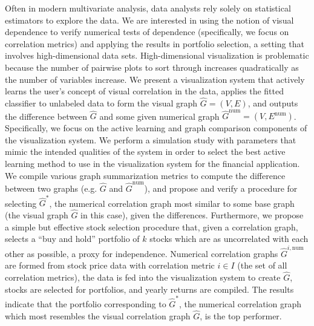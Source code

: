 Often in modern multivariate analysis, data analysts rely solely on statistical
estimators to explore the data. We are interested in using the notion of visual 
dependence to verify numerical tests of dependence (specifically, we 
focus on correlation metrics) and applying the results in portfolio selection, 
a setting that involves high-dimensional data sets. High-dimensional 
visualization is problematic because the number of pairwise plots to sort 
through increases quadratically as the number of variables increase.
We present a visualization system that actively learns the user's concept of
visual correlation in the data, applies the fitted classifier to unlabeled data 
to form the visual graph $\hat{G}=(V,E)$, and outputs the difference between 
$\hat{G}$ and some given numerical graph 
$\hat{G}^{\text{num}}=(V,E^{\text{num}})$.
Specifically, we focus on the active learning and graph comparison components 
of the visualization system. We perform a simulation study with parameters that 
mimic the intended qualities of the system in order to select the best active 
learning method to use in the visualization system for the financial 
application. We compile various graph summarization metrics to compute the 
difference between two graphs (e.g. $\hat{G}$ and $\hat{G}^{\text{num}}$), and 
propose and verify a procedure for selecting $\hat{G}^*$, the numerical 
correlation graph most 
similar to some base graph (the visual graph $\hat{G}$ in this case), given the 
differences. Furthermore, we propose a simple but effective stock selection 
procedure that, given a correlation graph,  selects a ``buy and hold'' 
portfolio of $k$ stocks which are as uncorrelated with each other as possible, 
a proxy for independence. 
Numerical correlation graphs $\hat{G}^{i, \text{num}}$ are formed from stock 
price 
data with correlation metric $i \in I$ (the set of all correlation metrics), 
the data is fed into the visualization 
system to create $\hat{G}$, stocks are selected for portfolios, and yearly 
returns 
are compiled. The results indicate that the portfolio corresponding to 
$\hat{G}^*$, 
the numerical correlation graph which most resembles the visual correlation 
graph $\hat{G}$, is the top performer. 